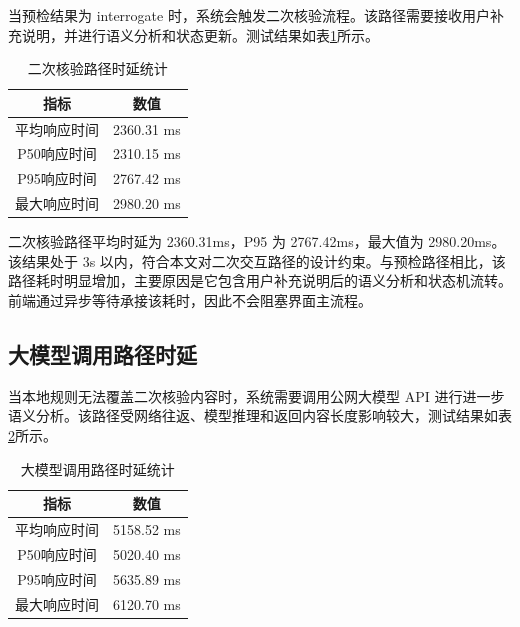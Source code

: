\documentclass{xduugthesis}
\begin{document}
当预检结果为 interrogate 时，系统会触发二次核验流程。该路径需要接收用户补充说明，并进行语义分析和状态更新。测试结果如表\ref{tab:secondary-check-latency}所示。

\begin{table}[H]
    \centering
    \caption{二次核验路径时延统计}
    \label{tab:secondary-check-latency}
    \begin{tabular}{|c|c|}
        \hline
        指标 & 数值 \\
        \hline
        平均响应时间 & 2360.31 ms \\
        \hline
        P50响应时间 & 2310.15 ms \\
        \hline
        P95响应时间 & 2767.42 ms \\
        \hline
        最大响应时间 & 2980.20 ms \\
        \hline
    \end{tabular}
\end{table}

二次核验路径平均时延为 2360.31ms，P95 为 2767.42ms，最大值为 2980.20ms。该结果处于 3s 以内，符合本文对二次交互路径的设计约束。与预检路径相比，该路径耗时明显增加，主要原因是它包含用户补充说明后的语义分析和状态机流转。前端通过异步等待承接该耗时，因此不会阻塞界面主流程。

\subsection{大模型调用路径时延}

当本地规则无法覆盖二次核验内容时，系统需要调用公网大模型 API 进行进一步语义分析。该路径受网络往返、模型推理和返回内容长度影响较大，测试结果如表\ref{tab:llm-path-latency}所示。

\begin{table}[H]
    \centering
    \caption{大模型调用路径时延统计}
    \label{tab:llm-path-latency}
    \begin{tabular}{|c|c|}
        \hline
        指标 & 数值 \\
        \hline
        平均响应时间 & 5158.52 ms \\
        \hline
        P50响应时间 & 5020.40 ms \\
        \hline
        P95响应时间 & 5635.89 ms \\
        \hline
        最大响应时间 & 6120.70 ms \\
        \hline
    \end{tabular}
\end{table}
\end{document}
